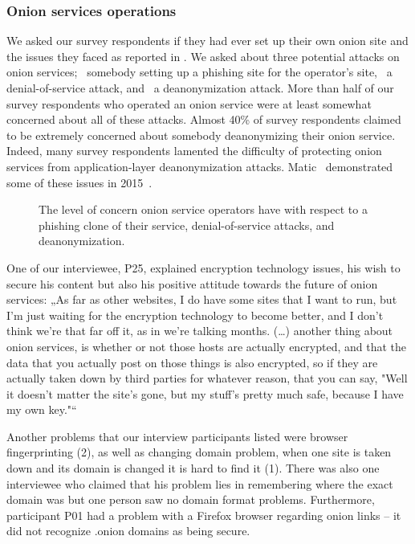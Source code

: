 \subsubsection{Onion services operations}
We asked our survey respondents if they had ever set up their own onion site and the issues they faced as reported in .  We asked about three potential attacks on onion services; \first~somebody setting up a
phishing site for the operator's site, \second~a denial-of-service attack, and
\third~a deanonymization attack.  More than half of our survey respondents who operated an onion service were at least
somewhat concerned about all of these attacks.  Almost 40\% of survey respondents claimed to be
extremely concerned about somebody deanonymizing their onion service.  Indeed,
many survey respondents lamented the difficulty of protecting onion services from
application-layer deanonymization attacks.  Matic \ea\ demonstrated some of
these issues in 2015~\cite{Matic2015a}.

\begin{figure}[t]
    \centering
    
    \caption{The level of concern onion service operators have with respect to a
    phishing clone of their service, denial-of-service attacks, and
    deanonymization.}
    \label{fig:onion-operation-concerns}
\end{figure}

One of our interviewee, P25, explained encryption technology issues, his wish to secure his content but also his positive attitude towards the future of onion services: „As far as other websites, I do have some sites that I want to run, but I'm just waiting for the encryption technology to become better, and I don't think we're that far off it, as in we're talking months. (…) another thing about onion services, is whether or not those hosts are actually encrypted, and that the data that you actually post on those things is also encrypted, so if they are actually taken down by third parties for whatever reason, that you can say, "Well it doesn't matter the site's gone, but my stuff's pretty much safe, because I have my own key."“

Another problems that our interview participants listed were browser fingerprinting (2), as well as changing domain problem, when one site is taken down and its domain is changed it is hard to find it (1). There was also one interviewee who claimed that his problem lies in remembering where the exact domain was but one person saw no domain format problems. Furthermore, participant P01 had a problem with a Firefox  browser regarding onion links – it did not recognize .onion domains as being secure. 

